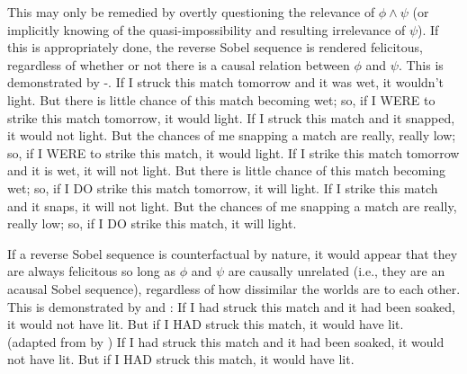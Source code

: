 This may only be remedied by overtly questioning the relevance of $\phi\land\psi$ (or implicitly knowing of the quasi-impossibility and resulting irrelevance of $\psi$). If this is appropriately done, the reverse Sobel sequence is rendered felicitous, regardless of whether or not there is a causal relation between $\phi$ and $\psi$. This is demonstrated by -.
\ex{}
    If I struck this match tomorrow and it was wet, it wouldn't light. But there is little chance of this match becoming wet; so, if I \MakeUppercase{were} to strike this match tomorrow, it would light.
\xe
\ex{}If I struck this match and it snapped, it would not light. But the chances of me snapping a match are really, really low; so, if I \MakeUppercase{were} to strike this match, it would light.
\xe
\ex{}
    If I strike this match tomorrow and it is wet, it will not light. But there is little chance of this match becoming wet; so, if I \MakeUppercase{do} strike this match tomorrow, it will light.
\xe
\ex{}If I strike this match and it snaps, it will not light. But the chances of me snapping a match are really, really low; so, if I \MakeUppercase{do} strike this match, it will light.
\xe

If a reverse Sobel sequence is counterfactual by nature, it would appear that they are always felicitous so long as $\phi$ and $\psi$ are causally unrelated (i.e., they are an acausal Sobel sequence), regardless of how dissimilar the worlds are to each other. This is demonstrated by  and :
\ex{}If I had struck this match and it had been soaked, it would not have lit. But if I \MakeUppercase{had} struck this match, it would have lit.\\%
\emptyfill(adapted from \textcite[p. 106]{Stalnaker1968} by \textcite[p. 487]{Lewis2018})
\xe
\ex{}If I had struck this match and it had been soaked, it would not have lit. But if I \MakeUppercase{had} struck this match, it would have lit.
\xe

